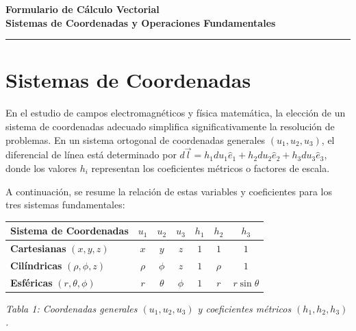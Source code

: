 \documentclass[11pt, a4paper]{article}
\begin{document}
\begin{center}
    {\LARGE \textbf{Formulario de Cálculo Vectorial}} \\
    \vspace{0.2cm}
    {\large \textbf{Sistemas de Coordenadas y Operaciones Fundamentales}} \\
    \vspace{0.1cm}
    \rule{\linewidth}{1.2pt}
\end{center}

\vspace{0.5cm}

\section{Sistemas de Coordenadas}

En el estudio de campos electromagnéticos y física matemática, la elección de un sistema de coordenadas adecuado simplifica significativamente la resolución de problemas. En un sistema ortogonal de coordenadas generales $(u_1, u_2, u_3)$, el diferencial de línea está determinado por $d\vec{l} = h_1 du_1 \hat{e}_1 + h_2 du_2 \hat{e}_2 + h_3 du_3 \hat{e}_3$, donde los valores $h_i$ representan los coeficientes métricos o factores de escala.

A continuación, se resume la relación de estas variables y coeficientes para los tres sistemas fundamentales:

\begin{center}
    \small
    \renewcommand{\arraystretch}{1.2}
    \begin{tabular}{lcccccc}
        \toprule
        \textbf{Sistema de Coordenadas} & \textbf{$u_1$} & \textbf{$u_2$} & \textbf{$u_3$} & \textbf{$h_1$} & \textbf{$h_2$} & \textbf{$h_3$} \\
        \midrule
        \textbf{Cartesianas} $(x, y, z)$ & $x$ & $y$ & $z$ & $1$ & $1$ & $1$ \\
        \textbf{Cilíndricas} $(\rho, \phi, z)$ & $\rho$ & $\phi$ & $z$ & $1$ & $\rho$ & $1$ \\
        \textbf{Esféricas} $(r, \theta, \phi)$ & $r$ & $\theta$ & $\phi$ & $1$ & $r$ & $r\sin\theta$ \\
        \bottomrule
    \end{tabular}
    \par\vspace{0.15cm}
    \small\textit{Tabla 1: Coordenadas generales $(u_1, u_2, u_3)$ y coeficientes métricos $(h_1, h_2, h_3)$.}
\end{center}
\end{document}
